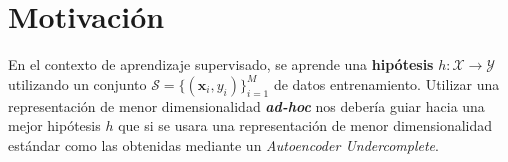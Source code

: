 \section{Motivación}

En el contexto de aprendizaje supervisado, se aprende una \textbf{hipótesis} $h\colon \mathcal{X} \rightarrow \mathcal{Y}$ utilizando un conjunto $\mathcal{S} = \{(\bm{x}_i, y_i)\}_{i=1}^M$ de datos entrenamiento. Utilizar una representación de menor dimensionalidad \textbf{\textit{ad-hoc}} nos debería guiar hacia una mejor hipótesis $h$ que si se usara una representación de menor dimensionalidad estándar como las obtenidas mediante un \textit{Autoencoder Undercomplete}.